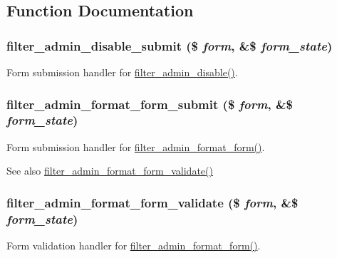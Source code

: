\subsection{Function Documentation}
\hypertarget{filter_8admin_8inc_a86acc152c70cd47fd4425333355fb36b}{
\subsubsection[{filter\_\-admin\_\-disable\_\-submit}]{\setlength{\rightskip}{0pt plus 5cm}filter\_\-admin\_\-disable\_\-submit (\$ {\em form}, \/  \&\$ {\em form\_\-state})}}
\label{filter_8admin_8inc_a86acc152c70cd47fd4425333355fb36b}
Form submission handler for \hyperlink{group__forms_ga425ee204872a718d5b49c40acce75b69}{filter\_\-admin\_\-disable()}. \hypertarget{filter_8admin_8inc_a1cabbcac9ccc4de52ea16a64a8c8cd54}{
\subsubsection[{filter\_\-admin\_\-format\_\-form\_\-submit}]{\setlength{\rightskip}{0pt plus 5cm}filter\_\-admin\_\-format\_\-form\_\-submit (\$ {\em form}, \/  \&\$ {\em form\_\-state})}}
\label{filter_8admin_8inc_a1cabbcac9ccc4de52ea16a64a8c8cd54}
Form submission handler for \hyperlink{group__forms_ga8f289105b56a610a4aac171301a2371b}{filter\_\-admin\_\-format\_\-form()}.

\begin{DoxySeeAlso}{See also}
\hyperlink{filter_8admin_8inc_a1ae5e99340abc69aadeff9d2a538d578}{filter\_\-admin\_\-format\_\-form\_\-validate()} 
\end{DoxySeeAlso}
\hypertarget{filter_8admin_8inc_a1ae5e99340abc69aadeff9d2a538d578}{
\subsubsection[{filter\_\-admin\_\-format\_\-form\_\-validate}]{\setlength{\rightskip}{0pt plus 5cm}filter\_\-admin\_\-format\_\-form\_\-validate (\$ {\em form}, \/  \&\$ {\em form\_\-state})}}
\label{filter_8admin_8inc_a1ae5e99340abc69aadeff9d2a538d578}
Form validation handler for \hyperlink{group__forms_ga8f289105b56a610a4aac171301a2371b}{filter\_\-admin\_\-format\_\-form()}.

